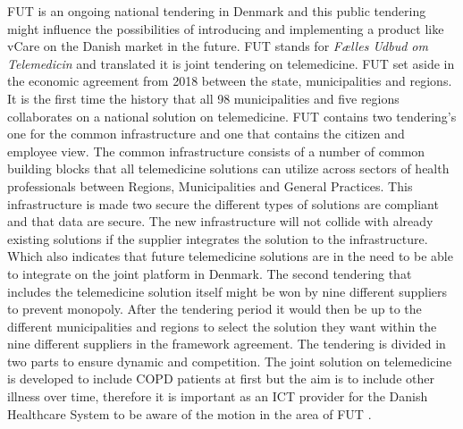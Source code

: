 FUT is an ongoing national tendering in Denmark and this public tendering might influence the possibilities of introducing and implementing a product like vCare on the Danish market in the future. FUT stands for \textit{Fælles Udbud om Telemedicin} and translated it is joint tendering on telemedicine. FUT set aside in the economic agreement from 2018 between the state, municipalities and regions. It is the first time the history that all 98 municipalities and five regions collaborates on a national solution on telemedicine. 
FUT contains two tendering's one for the common infrastructure and one that contains the citizen and employee view. 
The common infrastructure consists of a number of common building blocks that all telemedicine solutions can utilize across sectors of health professionals between Regions, Municipalities and General Practices. This infrastructure is made two secure the different types of solutions are compliant and that data are secure. The new infrastructure will not collide with already existing solutions if the supplier integrates the solution to the infrastructure. Which also indicates that future telemedicine solutions are in the need to be able to integrate on the joint platform in Denmark. 
The second tendering that includes the telemedicine solution itself might be won by nine different suppliers to prevent monopoly. After the tendering period it would then be up to the different municipalities and regions to select the solution they want within the nine different suppliers in the framework agreement. 
The tendering is divided in two parts to ensure dynamic and competition. 	
The joint solution on telemedicine is developed to include COPD patients at first but the aim is to include other illness over time, therefore it is important as an ICT provider for the Danish Healthcare System to be aware of the motion in the area of FUT \cite{FUT, FUT2}. 










